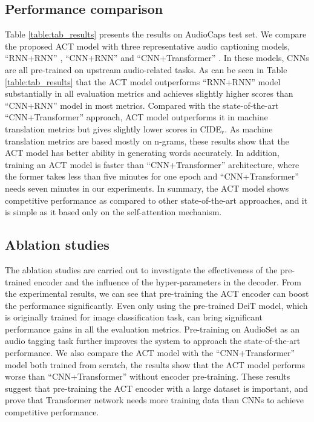 \documentclass{article}
\begin{document}
\begin{sloppy}
\subsection{Performance comparison}
\label{ssec:comparison}
Table \ref{table:tab_results} presents the results on AudioCaps test set. We compare the proposed ACT model with three representative audio captioning models, ``RNN+RNN'' \cite{kim2019audiocaps}, ``CNN+RNN'' \cite{xu2021investigating} and ``CNN+Transformer'' \cite{xinhao2021_t6}. In these models, CNNs are all pre-trained on upstream audio-related tasks. As can be seen in Table \ref{table:tab_results} that the ACT model outperforms ``RNN+RNN'' model substantially in all evaluation metrics and achieves slightly higher scores than ``CNN+RNN'' model in most metrics. Compared with the state-of-the-art ``CNN+Transformer'' approach, ACT model outperforms it in machine translation metrics but gives slightly lower scores in CIDE$_r$. As machine translation metrics are based mostly on n-grams, these results show that the ACT model has better ability in generating words accurately. In addition, training an ACT model is faster than ``CNN+Transformer'' architecture, where the former takes less than five minutes for one epoch and ``CNN+Transformer'' needs seven minutes in our experiments. In summary, the ACT model shows competitive performance as compared to other state-of-the-art approaches, and it is simple as it based only on the self-attention mechanism.

\subsection{Ablation studies}
\label{ssec:ablation_studies}
The ablation studies are carried out to investigate the effectiveness of the pre-trained encoder and the influence of the hyper-parameters in the decoder. From the experimental results, we can see that pre-training the ACT encoder can boost the performance significantly. Even only using the pre-trained DeiT model, which is originally trained for image classification task, can bring significant performance gains in all the evaluation metrics. Pre-training on AudioSet as an audio tagging task further improves the system to approach the state-of-the-art performance. We also compare the ACT model with the ``CNN+Transformer'' model both trained from scratch, the results show that the ACT model performs worse than ``CNN+Transformer'' without encoder pre-training. These results suggest that pre-training the ACT encoder with a large dataset is important, and prove that Transformer network needs more training data than CNNs to achieve competitive performance. 


\end{sloppy}
\end{document}
